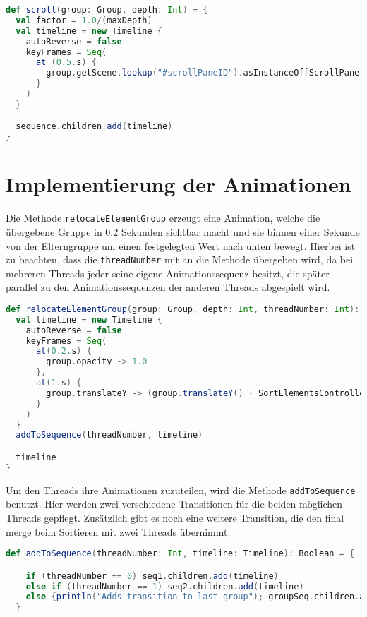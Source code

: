 \begin{lstlisting}[language=Scala,caption=Das Autoscrolling auf der Pane]
def scroll(group: Group, depth: Int) = {
  val factor = 1.0/(maxDepth)
  val timeline = new Timeline {
    autoReverse = false
    keyFrames = Seq(
      at (0.5.s) {
        group.getScene.lookup("#scrollPaneID").asInstanceOf[ScrollPane].vvalue -> (factor * (if(depth == 0){depth} else {depth + 1}))
      }
    )
  }

  sequence.children.add(timeline)
}
\end{lstlisting}

\section{Implementierung der Animationen}

Die Methode \texttt{relocateElementGroup} erzeugt eine Animation, welche die übergebene Gruppe in 0.2 Sekunden sichtbar macht und sie binnen einer Sekunde von der Elterngruppe um einen festgelegten Wert nach unten bewegt. Hierbei ist zu beachten, dass die \texttt{threadNumber} mit an die Methode übergeben wird, da bei mehreren Threads jeder seine eigene Animationssequenz besitzt, die später parallel zu den Animationssequenzen der anderen Threads abgespielt wird.

\begin{lstlisting}[language=Scala,caption=Umpositionierung der Elemente]
def relocateElementGroup(group: Group, depth: Int, threadNumber: Int): Timeline = {
  val timeline = new Timeline {
    autoReverse = false
    keyFrames = Seq(
      at(0.2.s) {
        group.opacity -> 1.0
      },
      at(1.s) {
        group.translateY -> (group.translateY() + SortElementsController.moveDownByPixel)
      }
    )
  }
  addToSequence(threadNumber, timeline)

  timeline
}
\end{lstlisting}

Um den Threads ihre Animationen zuzuteilen, wird die Methode \texttt{addToSequence} benutzt. Hier werden zwei verschiedene Transitionen für die beiden möglichen Threads gepflegt. Zusätzlich gibt es noch eine weitere Transition, die den final merge beim Sortieren mit zwei Threads übernimmt.

\begin{lstlisting}[language=Scala,caption=Einteilung der Animationen in die entsprechende SequentialTransition]
  def addToSequence(threadNumber: Int, timeline: Timeline): Boolean = {

    if (threadNumber == 0) seq1.children.add(timeline)
    else if (threadNumber == 1) seq2.children.add(timeline)
    else {println("Adds transition to last group"); groupSeq.children.add(timeline)}
  }
  \end{lstlisting}
